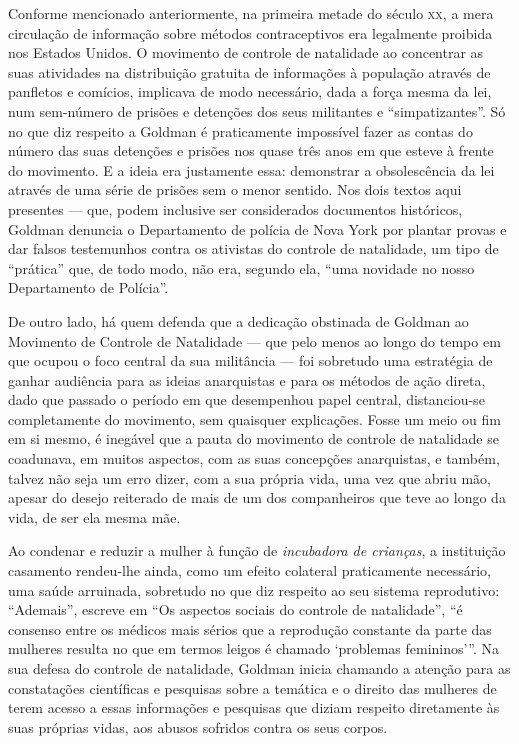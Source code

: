 Conforme mencionado anteriormente, na primeira metade do século \textsc{xx}, a
mera circulação de informação sobre métodos contraceptivos era
legalmente proibida nos Estados Unidos. O movimento de controle de
natalidade ao concentrar as suas atividades na distribuição gratuita de
informações à população através de panfletos e comícios, implicava de
modo necessário, dada a força mesma da lei, num sem-número de prisões e
detenções dos seus militantes e ``simpatizantes''. Só no que diz
respeito a Goldman é praticamente impossível fazer as contas do número
das suas detenções e prisões nos quase três anos em que esteve à frente
do movimento. E a ideia era justamente essa: demonstrar a obsolescência
da lei através de uma série de prisões sem o menor sentido. Nos dois
textos aqui presentes --- que, podem inclusive ser considerados
documentos históricos, Goldman denuncia o Departamento de polícia de
Nova York por plantar provas e dar falsos testemunhos contra os
ativistas do controle de natalidade, um tipo de ``prática'' que, de todo
modo, não era, segundo ela, ``uma novidade no nosso Departamento de
Polícia''. 

De outro lado, há quem defenda que a dedicação obstinada de
Goldman ao Movimento de Controle de Natalidade --- que pelo menos ao
longo do tempo em que ocupou o foco central da sua militância --- foi
sobretudo uma estratégia de ganhar audiência para as ideias anarquistas
e para os métodos de ação direta, dado que passado o período em que
desempenhou papel central, distanciou-se completamente do movimento, sem
quaisquer explicações. Fosse um meio ou fim em si mesmo, é inegável que
a pauta do movimento de controle de natalidade se coadunava, em muitos
aspectos, com as suas concepções anarquistas, e também, talvez não seja
um erro dizer, com a sua própria vida, uma vez que abriu mão, apesar do
desejo reiterado de mais de um dos companheiros que teve ao longo da
vida, de ser ela mesma mãe.

Ao condenar e reduzir a mulher à função de \textit{incubadora de crianças}, a
instituição casamento rendeu-lhe ainda, como um efeito colateral
praticamente necessário, uma saúde arruinada, sobretudo no que diz
respeito ao seu sistema reprodutivo: ``Ademais'', escreve em ``Os
aspectos sociais do controle de natalidade'', ``é consenso entre os
médicos mais sérios que a reprodução constante da parte das mulheres
resulta no que em termos leigos é chamado `problemas femininos'''. Na
sua defesa do controle de natalidade, Goldman inicia chamando a atenção
para as constatações científicas e pesquisas sobre a temática e o
direito das mulheres de terem acesso a essas informações e pesquisas que
diziam respeito diretamente às suas próprias vidas, aos abusos sofridos
contra os seus corpos. 

